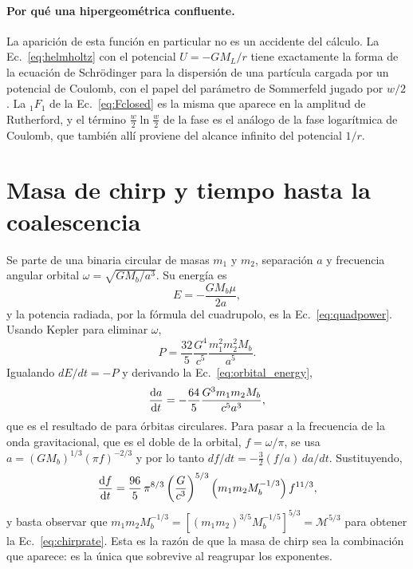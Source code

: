 \documentclass[11pt,a4paper,openany]{book}
\begin{document}
\paragraph{Por qu\'e una hipergeom\'etrica confluente.} La aparici\'on de esta
funci\'on en particular no es un accidente del c\'alculo. La
Ec.~\eqref{eq:helmholtz} con el potencial $U=-GM_L/r$ tiene exactamente la
forma de la ecuaci\'on de Schr\"odinger para la dispersi\'on de una part\'icula
cargada por un potencial de Coulomb, con el papel del par\'ametro de
Sommerfeld jugado por $w/2$ \citep{Deguchi1986}. La ${}_1F_1$ de la
Ec.~\eqref{eq:Fclosed} es la misma que aparece en la amplitud de Rutherford, y
el t\'ermino $\tfrac{w}{2}\ln\tfrac{w}{2}$ de la fase es el an\'alogo de la
fase logar\'itmica de Coulomb, que tambi\'en all\'i proviene del alcance
infinito del potencial $1/r$.

\section{Masa de chirp y tiempo hasta la coalescencia}
\label{ap:chirp}

Se parte de una binaria circular de masas $m_1$ y $m_2$, separaci\'on $a$ y
frecuencia angular orbital $\omega=\sqrt{GM_b/a^{3}}$. Su energ\'ia es
\begin{equation}
  E=-\frac{GM_b\mu}{2a} ,
  \label{eq:orbital_energy}
\end{equation}
y la potencia radiada, por la f\'ormula del cuadrupolo, es la
Ec.~\eqref{eq:quadpower}. Usando Kepler para eliminar $\omega$,
\begin{equation}
  P=\frac{32}{5}\frac{G^{4}}{c^{5}}\frac{m_1^{2}m_2^{2}M_b}{a^{5}} .
  \label{eq:power_a}
\end{equation}
Igualando $dE/dt=-P$ y derivando la Ec.~\eqref{eq:orbital_energy},
\begin{equation}
  \dv{a}{t}=-\frac{64}{5}\frac{G^{3}m_1m_2M_b}{c^{5}a^{3}} ,
  \label{eq:dadt}
\end{equation}
que es el resultado de \citet{Peters1964} para \'orbitas circulares. Para
pasar a la frecuencia de la onda gravitacional, que es el doble de la orbital,
$f=\omega/\pi$, se usa $a=(GM_b)^{1/3}(\pi f)^{-2/3}$ y por lo tanto
$df/dt=-\tfrac32(f/a)\,da/dt$. Sustituyendo,
\begin{equation}
  \dv{f}{t}=\frac{96}{5}\,\pi^{8/3}
  \left(\frac{G}{c^{3}}\right)^{5/3}
  \left(m_1m_2M_b^{-1/3}\right) f^{11/3} ,
  \label{eq:chirprate_raw}
\end{equation}
y basta observar que
$m_1m_2M_b^{-1/3}=\left[(m_1m_2)^{3/5}M_b^{-1/5}\right]^{5/3}
=\mathcal{M}^{5/3}$
para obtener la Ec.~\eqref{eq:chirprate}. Esta es la raz\'on de que la masa de
chirp sea la combinaci\'on que aparece: es la \'unica que sobrevive al
reagrupar los exponentes.
\end{document}
